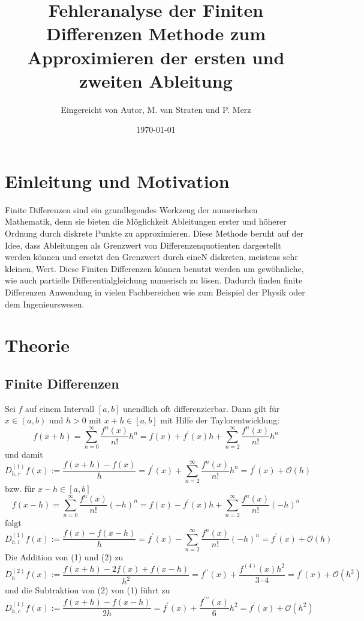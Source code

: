 \documentclass{scrartcl}
\title{Fehleranalyse der Finiten Differenzen Methode zum Approximieren der ersten und zweiten Ableitung}
\author{%
  Eingereicht von Autor, M. van Straten und P. Merz
}
\date{\today}
\theoremstyle{remark}
\begin{document}
\maketitle
\tableofcontents
\cleardoublepage


\section{Einleitung und Motivation}
Finite Differenzen sind ein grundlegendes Werkzeug der numerischen Mathematik, denn sie bieten die 
Möglichkeit Ableitungen erster und höherer Ordnung durch diskrete Punkte zu approximieren.
Diese Methode beruht auf der Idee, dass Ableitungen als Grenzwert von Differenzenquotienten dargestellt werden
können und ersetzt den Grenzwert durch eineN diskreten, meistens sehr kleinen, Wert.
Diese Finiten Differenzen können benutzt werden um gewöhnliche, wie auch partielle Differentialgleichung 
numerisch zu lösen. Dadurch finden finite Differenzen Anwendung in vielen Fachbereichen wie zum Beispiel der 
Physik oder dem Ingenieurswesen. \cite{FiniteDifferenzen} 


\section{Theorie}
\subsection{Finite Differenzen} %
Sei \(f\) auf einem Intervall \([a,b]\) unendlich oft differenzierbar. Dann gilt für \(x \in (a,b)\) und \(h > 0 \) mit \(x + h \in [a,b]\) mit Hilfe der Taylorentwicklung:
\begin{equation}
  f(x + h) = \sum_{n=0}^{\infty}\frac{f^{n}(x)}{n!}h^{n} = f(x) + f^{\prime}(x)h + \sum_{n=2}^{\infty}\frac{f^{n}(x)}{n!}h^{n}
\end{equation}
und damit
\[ D_{h, r}^{(1)}f(x) := \frac{f(x + h) - f(x)}{h} = f^{\prime}(x) + \sum_{n=2}^{\infty}\frac{f^{n}(x)}{n!}h^{n} = f^{\prime}(x) + \mathcal{O}(h)\]
bzw. für \(x - h \in [a,b]\)
\begin{equation}
  f(x - h) = \sum_{n=0}^{\infty}\frac{f^{n}(x)}{n!}(-h)^{n} = f(x) - f^{\prime}(x)h + \sum_{n=2}^{\infty}\frac{f^{n}(x)}{n!}(-h)^{n}
\end{equation}
folgt
\[ D_{h, l}^{(1)}f(x) := \frac{f(x) - f(x - h)}{h} = f^{\prime}(x) - \sum_{n=2}^{\infty}\frac{f^{n}(x)}{n!}(-h)^{n} = f^{\prime}(x) + \mathcal{O}(h)\]
Die Addition von (1) und (2) zu
\[ D_{h}^{(2)}f(x) := \frac{f(x + h) -2f(x) + f(x - h)}{h^2} = f^{\prime\prime}(x) + \frac{f^{(4)}(x)h^{2}}{3 \cdot 4} = f^{\prime}(x) + \mathcal{O}(h^{2})\]
und die Subtraktion von (2) von (1) führt zu
\[ D_{h, c}^{(1)}f(x) := \frac{f(x + h) - f(x - h)}{2h} = f^{\prime}(x) + \frac{f^{\prime\prime\prime}(x)}{6}h^{2} = f^{\prime}(x) + \mathcal{O}(h^{2})\] \cite{NumericalDifferentiation}
\end{document}
